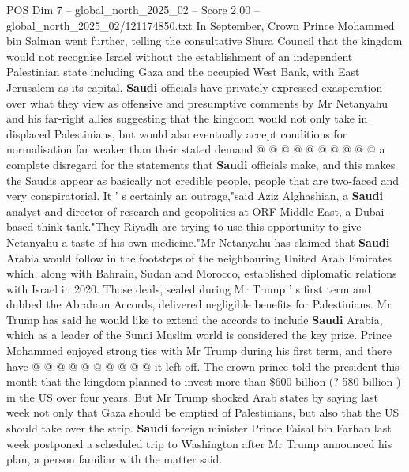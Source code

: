 \begin{textsample}{POS Dim 7 – global\_north\_2025\_02 – Score 2.00 – global\_north\_2025\_02/121174850.txt}
In September, Crown Prince Mohammed bin Salman went further, telling the consultative Shura Council that the kingdom would not recognise Israel without the establishment of an independent Palestinian state including Gaza and the occupied West Bank, with East Jerusalem as its capital. \textbf{Saudi} officials have privately expressed exasperation over what they view as offensive and presumptive comments by Mr Netanyahu and his far-right allies suggesting that the kingdom would not only take in displaced Palestinians, but would also eventually accept conditions for normalisation far weaker than their stated demand @ @ @ @ @ @ @ @ @ @ a complete disregard for the statements that \textbf{Saudi} officials make, and this makes the Saudis appear as basically not credible people, people that are two-faced and very conspiratorial.
It ' s certainly an outrage,"said Aziz Alghashian, a \textbf{Saudi} analyst and director of research and geopolitics at ORF Middle East, a Dubai-based think-tank."They Riyadh are trying to use this opportunity to give Netanyahu a taste of his own medicine."Mr Netanyahu has claimed that \textbf{Saudi} Arabia would follow in the footsteps of the neighbouring United Arab Emirates which, along with Bahrain, Sudan and Morocco, established diplomatic relations with Israel in 2020.
Those deals, sealed during Mr Trump ' s first term and dubbed the Abraham Accords, delivered negligible benefits for Palestinians.
Mr Trump has said he would like to extend the accords to include \textbf{Saudi} Arabia, which as a leader of the Sunni Muslim world is considered the key prize.
Prince Mohammed enjoyed strong ties with Mr Trump during his first term, and there have @ @ @ @ @ @ @ @ @ @ it left off.
The crown prince told the president this month that the kingdom planned to invest more than \$600 billion (? 580 billion ) in the US over four years.
But Mr Trump shocked Arab states by saying last week not only that Gaza should be emptied of Palestinians, but also that the US should take over the strip. \textbf{Saudi} foreign minister Prince Faisal bin Farhan last week postponed a scheduled trip to Washington after Mr Trump announced his plan, a person familiar with the matter said.

\end{textsample}

